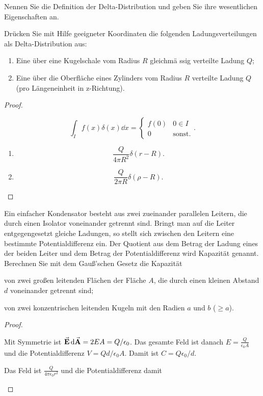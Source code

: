 \begin{Problem}
	\begin{parts}
	\item Nennen Sie die Definition der Delta-Distribution und geben Sie ihre wesentlichen Eigenschaften an.
	\item Drücken Sie mit Hilfe geeigneter Koordinaten die folgenden Ladungsverteilungen als Delta-Distribution aus:
		\begin{enumerate}[label=(\arabic*)]
			\item  Eine über eine Kugelschale vom Radius $R$ gleichmä ssig verteilte Ladung $Q$; 
			\item Eine über die Oberfläche eines Zylinders vom Radius $R$ verteilte Ladung $Q$ (pro Längeneinheit in z-Richtung). 
		\end{enumerate}
	\end{parts}
\end{Problem}

\begin{proof}
	\begin{parts}
	\item \[
		\int_I f(x)\delta(x)\dd{x}=\begin{cases}
			f(0) & 0\in I\\
			0 & \text{sonst.}
		\end{cases}
	.\] 
\item 
	\begin{enumerate}[label=(\arabic*)]
		\item \[
		\frac{Q}{4\pi R^2}\delta(r-R)
		.\] 
	\item \[
	\frac{Q}{2\pi R}\delta(\rho - R)
	.\] 
	\end{enumerate}
	\end{parts}
\end{proof}

\begin{Problem}
Ein einfacher Kondensator besteht aus zwei zueinander parallelen Leitern, die durch einen Isolator voneinander getrennt sind. Bringt man auf die Leiter entgegengesetzt gleiche Ladungen, so stellt sich zwischen den Leitern eine bestimmte Potentialdifferenz ein. Der Quotient aus dem Betrag der Ladung eines der beiden Leiter und dem Betrag der Potentialdifferenz wird Kapazität genannt. Berechnen Sie mit dem Gauß’schen Gesetz die Kapazität	
\begin{parts}
\item von zwei großen leitenden Flächen der Fläche $A$, die durch einen kleinen Abstand $d$ voneinander getrennt sind;
\item von zwei konzentrischen leitenden Kugeln mit den Radien $a$ und $b$ ($\ge a$). 
\end{parts}
\end{Problem}
\begin{proof}
	\begin{parts}
	\item Mit Symmetrie ist $\va E \dd{\va A}=2EA=Q / \epsilon_0$. Das gesamte Feld ist danach  $E = \frac{Q}{\epsilon_0 A}$ und die Potentialdifferenz $V=Qd / \epsilon_0 A$. Damit ist $C=Q\epsilon_0 / d$.
	\item Das Feld ist $\frac{Q}{4\pi\epsilon_0 r^2}$ und die Potentialdifferenz damit
	\end{parts}
\end{proof}
